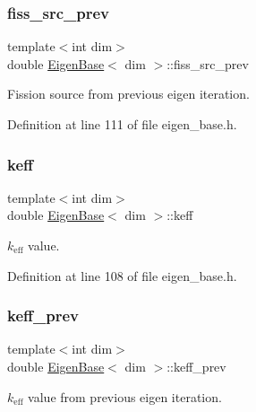 \subsubsection{\texorpdfstring{fiss\+\_\+src\+\_\+prev}{fiss\_src\_prev}}
{\footnotesize\ttfamily template$<$int dim$>$ \\
double \hyperlink{class_eigen_base}{Eigen\+Base}$<$ dim $>$\+::fiss\+\_\+src\+\_\+prev\hspace{0.3cm}{\ttfamily [protected]}}



Fission source from previous eigen iteration. 



Definition at line 111 of file eigen\+\_\+base.\+h.

\mbox{\label{class_eigen_base_a9373e0bd7462b70829d88b82cb66ac10}} 
\subsubsection{\texorpdfstring{keff}{keff}}
{\footnotesize\ttfamily template$<$int dim$>$ \\
double \hyperlink{class_eigen_base}{Eigen\+Base}$<$ dim $>$\+::keff\hspace{0.3cm}{\ttfamily [protected]}}



$k_\mathrm{eff}$ value. 



Definition at line 108 of file eigen\+\_\+base.\+h.

\mbox{\label{class_eigen_base_a1499f0cb877e5dff2013328e06a29b4a}} 
\subsubsection{\texorpdfstring{keff\+\_\+prev}{keff\_prev}}
{\footnotesize\ttfamily template$<$int dim$>$ \\
double \hyperlink{class_eigen_base}{Eigen\+Base}$<$ dim $>$\+::keff\+\_\+prev\hspace{0.3cm}{\ttfamily [protected]}}



$k_\mathrm{eff}$ value from previous eigen iteration. 



